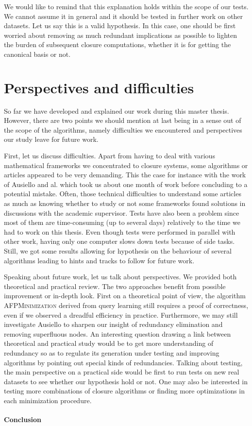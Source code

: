 \vspace{1.2em}

We would like to remind that this explanation holds within the scope of our
tests. We cannot assume it in general and it should be tested in further work on other datasets. Let us say this is a valid hypothesis. In this case, one
should be first worried about removing as much  redundant implications as possible to lighten the burden of subsequent closure computations, whether it is for getting the canonical basis or not.


\section{Perspectives and difficulties}

So far we have developed and explained our work during this master thesis. However, there are two points we should mention at last being in a sense out of 
the scope of the algorithms, namely difficulties we encountered and perspectives
our study leave for future work. 

\vspace{1.2em}

First, let us discuss difficulties. Apart from having to deal with various mathematical frameworks we concentrated to closure systems, some algorithms
or articles appeared to be very demanding. This the case for instance with the work of Ausiello and al. which took us about one month of work before concluding to a potential mistake. Often, those technical difficulties to understand some articles as much as knowing whether to study or not some frameworks found solutions in discussions with the academic supervisor. Tests have also been a problem since most of them are time-consuming (up to several days) relatively to the time we had to work on this thesis. Even though tests were performed in parallel with other work, having only one computer slows down tests because of side tasks. Still, we got some results allowing for hypothesis
on the behaviour of several algorithms leading to hints and tracks to follow for future work.

\vspace{1.2em}

Speaking about future work, let us talk about perspectives. We provided both theoretical and practical review. The two approaches benefit from possible improvement or in-depth look. First on a theoretical point of view, the algorithm \textsc{AFPMinimization} derived from query learning still requires
a proof of correctness, even if we observed a dreadful efficiency in practice. Furthermore, we may still investigate Ausiello to sharpen our insight of redundancy elimination and removing superfluous nodes. An interesting question
drawing a link between theoretical and practical study would be to get more
understanding of redundancy so as to regulate its generation under testing and
improving algorithms by pointing out special kinds of redundancies. Talking about testing, the main perspective on a practical side would be first to run tests on new real datasets to see whether our hypothesis hold or not. One may also be interested in testing more combinations of closure algorithms or finding
more optimizations in each minimization procedure.


\paragraph{Conclusion}

